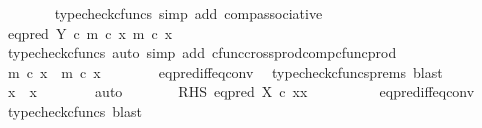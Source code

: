 \begin{isabellebody}
\ \ \ \ \ \ \isamarkupfalse%
\ {\isacharparenleft}{\kern0pt}typecheck{\isacharunderscore}{\kern0pt}cfuncs{\isacharcomma}{\kern0pt}\ simp\ add{\isacharcolon}{\kern0pt}\ comp{\isacharunderscore}{\kern0pt}associative{}{\isacharparenright}{\kern0pt}\isanewline
\ \ \ \ \isamarkupfalse%
\ \isamarkupfalse%
\ {\isachardoublequoteopen}eq{\isacharunderscore}{\kern0pt}pred\ Y\ {\isasymcirc}\isactrlsub c\ {\isasymlangle}m\ {\isasymcirc}\isactrlsub c\ x{}{\isacharcomma}{\kern0pt}\ m\ {\isasymcirc}\isactrlsub c\ x{}{\isasymrangle}\ {\isacharequal}{\kern0pt}\ {\isasymf}{\isachardoublequoteclose}\isanewline
\ \ \ \ \ \ \isamarkupfalse%
\ {\isacharparenleft}{\kern0pt}typecheck{\isacharunderscore}{\kern0pt}cfuncs{\isacharcomma}{\kern0pt}\ auto\ simp\ add{\isacharcolon}{\kern0pt}\ cfunc{\isacharunderscore}{\kern0pt}cross{\isacharunderscore}{\kern0pt}prod{\isacharunderscore}{\kern0pt}comp{\isacharunderscore}{\kern0pt}cfunc{\isacharunderscore}{\kern0pt}prod{\isacharparenright}{\kern0pt}\isanewline
\ \ \ \ \isamarkupfalse%
\ \isamarkupfalse%
\ {\isachardoublequoteopen}m\ {\isasymcirc}\isactrlsub c\ x{}\ {\isasymnoteq}\ m\ {\isasymcirc}\isactrlsub c\ x{}{\isachardoublequoteclose}\isanewline
\ \ \ \ \ \ \isamarkupfalse%
\ eq{\isacharunderscore}{\kern0pt}pred{\isacharunderscore}{\kern0pt}iff{\isacharunderscore}{\kern0pt}eq{\isacharunderscore}{\kern0pt}conv\ \isamarkupfalse%
\ {\isacharparenleft}{\kern0pt}typecheck{\isacharunderscore}{\kern0pt}cfuncs{\isacharunderscore}{\kern0pt}prems{\isacharcomma}{\kern0pt}\ blast{\isacharparenright}{\kern0pt}\isanewline
\ \ \ \ \isamarkupfalse%
\ \isamarkupfalse%
\ {\isachardoublequoteopen}x{}\ {\isasymnoteq}\ x{}{\isachardoublequoteclose}\isanewline
\ \ \ \ \ \ \isamarkupfalse%
\ auto\isanewline
\ \ \ \ \isamarkupfalse%
\ \isamarkupfalse%
\ RHS{\isacharcolon}{\kern0pt}\ {\isachardoublequoteopen}eq{\isacharunderscore}{\kern0pt}pred\ X\ {\isasymcirc}\isactrlsub c\ {\isasymlangle}x{}{\isacharcomma}{\kern0pt}x{}{\isasymrangle}\ {\isacharequal}{\kern0pt}\ {\isasymf}{\isachardoublequoteclose}\isanewline
\ \ \ \ \ \ \isamarkupfalse%
\ eq{\isacharunderscore}{\kern0pt}pred{\isacharunderscore}{\kern0pt}iff{\isacharunderscore}{\kern0pt}eq{\isacharunderscore}{\kern0pt}conv\ \isamarkupfalse%
\ {\isacharparenleft}{\kern0pt}typecheck{\isacharunderscore}{\kern0pt}cfuncs{\isacharcomma}{\kern0pt}\ blast{\isacharparenright}{\kern0pt}\isanewline

\end{isabellebody}
